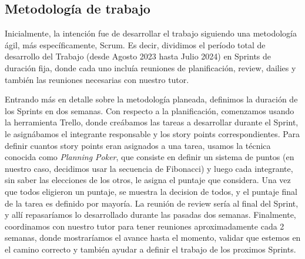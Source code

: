 
\subsection{Metodología de trabajo}

\noindent Inicialmente, la intención fue de desarrollar el trabajo siguiendo una metodología ágil, más específicamente, Scrum.
Es decir, dividimos el período total de desarrollo del Trabajo (desde Agosto 2023 hasta Julio 2024) en Sprints de duración fija,
donde cada uno incluía reuniones de planificación, review, dailies y también las reuniones necesarias con nuestro tutor.

\noindent Entrando más en detalle sobre la metodología planeada, definimos la duración de los Sprints en dos semanas. Con respecto a
la planificación, comenzamos usando la herramienta Trello, donde creábamos las tareas a desarrollar durante el Sprint, le asignábamos
el integrante responsable y los story points correspondientes. Para definir cuantos story points eran asignados a una tarea, usamos la
técnica conocida como \textit{Planning Poker}, que consiste en definir un sistema de puntos (en nuestro caso, decidimos usar la secuencia
de Fibonacci) y luego cada integrante, sin saber las elecciones de los otros, le asigna el puntaje que considera. Una vez que todos
eligieron un puntaje, se muestra la decision de todos, y el puntaje final de la tarea es definido por mayoría. La reunión de review sería
al final del Sprint, y allí repasaríamos lo desarrollado durante las pasadas dos semanas. Finalmente, coordinamos con nuestro tutor para tener reuniones aproximadamente cada 2 semanas, donde mostraríamos el avance hasta el momento,
validar que estemos en el camino correcto y también ayudar a definir el trabajo de los proximos Sprints.

